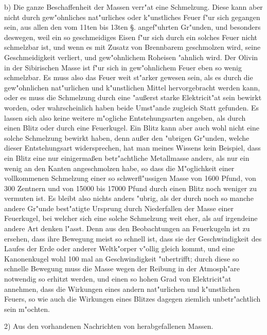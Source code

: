 \documentclass[a4paper, 11pt, oneside, polutonikogreek, german]{article}
\begin{document}
b) Die ganze Beschaffenheit der Massen verr"at eine Schmelzung. Diese kann aber nicht durch gew"ohnliches nat"urliches oder k"unstliches Feuer f"ur sich gegangen sein, aus allen den vom 11ten bis 13ten §. angef"uhrten Gr"unden, und besonders deswegen, weil ein so geschmeidiges Eisen f"ur sich durch ein solches Feuer nicht schmelzbar ist, und wenn es mit Zusatz von Brennbarem geschmolzen wird, seine Geschmeidigkeit verliert, und gew"ohnlichem Roheisen "ahnlich wird. Der Olivin in der Sibirischen Masse ist f"ur sich in gew"ohnlichem Feuer eben so wenig schmelzbar. Es muss also das Feuer weit st"arker gewesen sein, als es durch die gew"ohnlichen nat"urlichen und k"unstlichen Mittel hervorgebracht werden kann, oder es muss die Schmelzung durch eine "außerst starke Elektricit"at sein bewirkt worden, oder wahrscheinlich haben beide Umst"ande zugleich Statt gefunden. Es lassen sich also keine weitere m"ogliche Entstehungsarten angeben, als durch einen Blitz oder durch eine Feuerkugel. Ein Blitz kann aber auch wohl nicht eine solche Schmelzung bewirkt haben, denn außer den "ubrigen Gr"unden, welche dieser Entstehungsart widersprechen, hat man meines Wissens kein Beispiel, dass ein Blitz eine nur einigermaßen betr"achtliche Metallmasse anders, als nur ein wenig an den Kanten angeschmolzen habe, so dass die M"oglichkeit einer vollkommenen Schmelzung einer so schwerfl"ussigen Masse von 1600 Pfund, von 300 Zentnern und von 15000 bis 17000 Pfund durch einen Blitz noch weniger zu vermuten ist. Es bleibt also nichts anders "ubrig, als der durch noch so manche andere Gr"unde best"atigte Ursprung durch Niederfallen der Masse einer Feuerkugel, bei welcher sich eine solche Schmelzung weit eher, als auf irgendeine andere Art denken l"asst. Denn aus den Beobachtungen an Feuerkugeln ist zu ersehen, dass ihre Bewegung meist so schnell ist, dass sie der Geschwindigkeit des Laufes der Erde oder anderer Weltk"orper v"ollig gleich kommt, und eine Kanonenkugel wohl 100 mal an Geschwindigkeit "ubertrifft; durch diese so schnelle Bewegung muss die Masse wegen der Reibung in der Atmosph"are notwendig so erhitzt werden, und einen so hohen Grad von Elektricit"at annehmen, dass die Wirkungen eines andern nat"urlichen und k"unstlichen Feuers, so wie auch die Wirkungen eines Blitzes dagegen ziemlich unbetr"achtlich sein m"ochten.

2) Aus den vorhandenen Nachrichten von herabgefallenen Massen.
\end{document}
